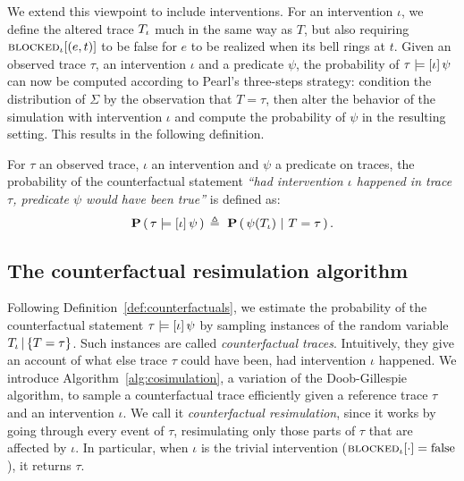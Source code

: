 We extend this viewpoint to include interventions. For an intervention
$\iota$, we define the altered trace ${T_\iota}{}$ much in the same way
as $T$, but also requiring ${\textsc{blocked}}_{\iota}[(e, t)]$ to be false for
$e$ to be realized when its bell rings at $t$.  Given an observed
trace $\tau$, an intervention $\iota$ and a predicate $\psi$, the
probability of $\tau \models [\iota] \, \psi{}$ can now be computed according to Pearl's
three-steps strategy: \ItAbduction{} condition the distribution of
$\Sigma$ by the observation that $T=\tau$, then \ItAction{} alter the
behavior of the simulation with intervention $\iota$ and
\ItPrediction{} compute the probability of $\psi$ in the resulting
setting. This results in the following definition.

\begin{definition}\label{def:counterfactuals}
  For $\tau$ an observed trace, $\iota$ an intervention and $\psi$ a
  predicate on traces, the probability of the counterfactual statement
  \textit{``had intervention $\iota$ happened in trace $\tau$,
    predicate $\psi$ would have been true''} is defined as:
  \[ \PCFST{} \eqdef \ \ProbParen{\psi(\ATRAJ{}) \ |\ T = \tau}. \]
\end{definition}

\subsection{The counterfactual resimulation algorithm}
\label{subsec:cosim-algo}

Following Definition~\ref{def:counterfactuals}, we estimate the
probability of the counterfactual statement $\tau \models [\iota] \, \psi{}$ by sampling
instances of the random variable ${T_\iota\,|\,\{T=\tau\}}{}$. Such instances are called
\emph{counterfactual traces}. Intuitively, they give an account of
what else trace $\tau$ could have been, had intervention $\iota$
happened.  We introduce Algorithm~\ref{alg:cosimulation}, a variation
of the Doob-Gillespie algorithm, to sample a counterfactual trace
efficiently given a reference trace $\tau$ and an intervention
$\iota$. We call it \emph{counterfactual resimulation}, since it works
by going through every event of $\tau$, resimulating only those parts
of $\tau$ that are affected by $\iota$. In particular, when $\iota$ is
the trivial intervention (${\textsc{blocked}}_{\iota}[\cdot] = \text{false}$), it
returns $\tau$.

